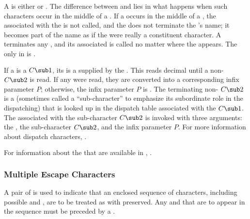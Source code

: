 A  is either  or .
The difference between  and   
lies in what happens when such characters occur in the middle of a .  
If a   occurs in the middle of a ,
the  associated 
with the   is not called,
and the
  does not terminate the 's name; it
becomes part of the name as if the  were really a constituent
character.  A   terminates any ,
and its associated 
is called no matter where the  appears.
The only   in  
is .

If a  is a  $C\sub 1$,
its  is a  supplied by the .
This  reads decimal   until a non-
$C\sub 2$ is read.
If any  were read,
they are converted into a corresponding  infix parameter $P$;
otherwise, the infix parameter $P$ is \nil.  
The terminating non- $C\sub 2$ is a  
(sometimes called a ``sub-character'' to emphasize its subordinate role in the dispatching)
that is looked up in the dispatch table associated with
the  $C\sub 1$.
The  associated with the sub-character $C\sub 2$ 
is invoked with three arguments:
     the ,
     the sub-character $C\sub 2$,
 and the infix parameter $P$.
For more information about dispatch characters,
.

For information about the  
that are available in ,
\seesection\StandardMacroChars.

\subsubsection{Multiple Escape Characters}

A pair of  
is used to indicate that an enclosed sequence of characters,
including possible  and  ,
are to be treated as   
with  preserved.
Any  and   
that are to appear in the sequence must be preceded by a  
.  

